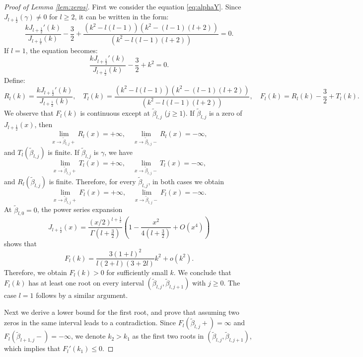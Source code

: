 \documentclass[10pt,a4paper]{amsart}
\begin{document}
\begin{proof}[Proof of Lemma \ref{lem:zeros}]
  First we consider the equation \eqref{eq:alphaY}. Since $J_{l + \frac{1}{2}}
  (\gamma) \neq 0$ for $l \geqslant 2$, it can be written in the form:
  \[ \frac{kJ_{l + \frac{1}{2}}' (k)}{J_{l + \frac{1}{2}} (k)} - \frac{3}{2} +
     \frac{(k^2 - l (l - 1))  (k^2 - (l - 1) (l + 2))}{(k^2 - l (l - 1) (l +
     2))} = 0. \]
  If $l = 1$, the equation becomes:
  \[ \frac{kJ_{l + \frac{1}{2}}' (k)}{J_{l + \frac{1}{2}} (k)} - \frac{3}{2} +
     k^2 = 0. \]
  Define:
  \[ R_l (k) = \frac{kJ_{l + \frac{1}{2}}' (k)}{J_{l + \frac{1}{2}} (k)},
     \quad T_l (k) = \frac{(k^2 - l (l - 1))  (k^2 - (l - 1) (l + 2))}{(k^2 -
     l (l - 1) (l + 2))}, \quad F_l (k) = R_l (k) - \frac{3}{2} + T_l (k) . \]
  We observe that $F_l (k)$ is continuous except at $\tilde{\beta}_{l, j}$ ($j
  \geqslant 1$). If $\tilde{\beta}_{l, j}$ is a zero of $J_{l + \frac{1}{2}}
  (x)$, then
  \[ \lim_{x \rightarrow \tilde{\beta}_{l, j} +} R_l (x) = + \infty, \quad
     \lim_{x \rightarrow \tilde{\beta}_{l, j} -} R_l (x) = - \infty, \]
  and $T_l (\tilde{\beta}_{l, j})$ is finite. If $\tilde{\beta}_{l, j}$ is
  $\gamma$, we have
  \[ \lim_{x \rightarrow \tilde{\beta}_{l, j} +} T_l (x) = + \infty, \quad
     \lim_{x \rightarrow \tilde{\beta}_{l, j} -} T_l (x) = - \infty, \]
  and $R_l (\tilde{\beta}_{l, j})$ is finite. Therefore, for every
  $\tilde{\beta}_{l, j}$, in both cases we obtain 
  \[ \lim_{x \rightarrow \tilde{\beta}_{l, j} +} F_l (x) = + \infty, \quad
     \lim_{x \rightarrow \tilde{\beta}_{l, j} -} F_l (x) = - \infty . \]
  At $\tilde{\beta}_{l, 0} = 0$, the power series
  expansion
  \[ J_{l + \frac{1}{2}} (x) = \frac{(x / 2)^{l + \frac{1}{2}}}{\Gamma (l +
     \frac{3}{2})}  (1 - \frac{x^2}{4 (l + \frac{3}{2})} + O (x^4)) \]
  shows that
  \[ F_l (k) = \frac{3 (1 + l)^2}{l (2 + l)  (3 + 2 l)} k^2 + o (k^2) . \]
  Therefore, we obtain $F_l (k) > 0$ for sufficiently small $k$. We conclude that $F_l
  (k)$ has at least one root on every interval $(\tilde{\beta}_{l, j},
  \tilde{\beta}_{l, j + 1})$ with $j \geqslant 0$. The case $l = 1$ follows by
  a similar argument.
  
  Next we derive a lower bound for the first root, and prove that assuming two
  zeros in the same interval leads to a contradiction. Since $F_l 
  (\tilde{\beta}_{l, j} +) = \infty$ and $F_l  (\tilde{\beta}_{l + 1, j} -) =
  - \infty$, we denote $k_2 > k_1$ as the first two roots in
  $(\tilde{\beta}_{l, j}, \tilde{\beta}_{l, j + 1})$, which implies that $F_l'
  (k_1) \leqslant 0$.
  

\end{proof}
\end{document}
